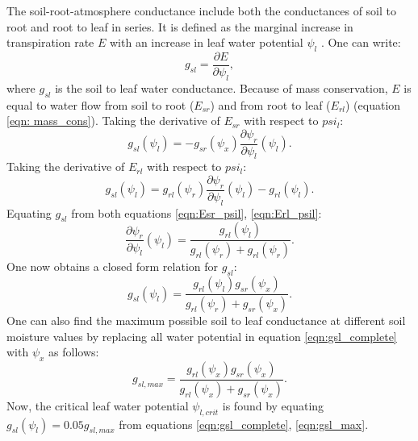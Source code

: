 \documentclass[utf8]{frontiersSCNS} %
\begin{document}
The soil-root-atmosphere conductance include both the conductances of soil to root and root to leaf in series. It is defined as the marginal increase in transpiration rate $E$ with an increase in leaf water potential $\psi_l$ \citep{sperry_what_2015}. One can write:
\begin{equation}
    \label{eqn:g_sl}
    g_{sl} = \frac{\partial E}{\partial \psi_l},
\end{equation}
where $g_{sl}$ is the soil to leaf water conductance. Because of mass conservation, $E$ is equal to water flow from soil to root ($E_{sr}$) and from root to leaf ($E_{rl}$) (equation \ref{eqn: mass_cons}).
Taking the derivative of $E_{sr}$ with respect to $psi_l$:
\begin{equation}
    \label{eqn:Esr_psil}
    g_{sl} (\psi_l) = - g_{sr} (\psi_x) \frac{\partial \psi_r}{\partial \psi_l} (\psi_l).
\end{equation}
Taking the derivative of $E_{rl}$ with respect to $psi_l$:
\begin{equation}
    \label{eqn:Erl_psil}
    g_{sl} (\psi_l) = g_{rl} (\psi_r) \frac{\partial \psi_r}{\partial \psi_l} (\psi_l) - g_{rl} (\psi_l).
\end{equation}
Equating $g_{sl}$ from both equations \ref{eqn:Esr_psil}, \ref{eqn:Erl_psil}:
\begin{equation}
    \label{eqn:psir_psil}
    \frac{\partial \psi_r}{\partial \psi_l} (\psi_l) = \frac{g_{rl} (\psi_l)}{g_{rl} (\psi_r) + g_{rl} (\psi_r)}.
\end{equation}
One now obtains a closed form relation for $g_{sl}$:
\begin{equation}
    \label{eqn:gsl_complete}
    g_{sl} (\psi_l) = \frac{g_{rl} (\psi_l) g_{sr} (\psi_x)}{g_{rl} (\psi_r) + g_{sr} (\psi_x)}.
\end{equation}
One can also find the maximum possible soil to leaf conductance at different soil moisture values by replacing all water potential in equation \ref{eqn:gsl_complete} with $\psi_x$ as follows:
\begin{equation}
    \label{eqn:gsl_max}
    g_{sl,max} = \frac{g_{rl} (\psi_x) g_{sr} (\psi_x)}{g_{rl} (\psi_x) + g_{sr} (\psi_x)}.
\end{equation}
Now, the critical leaf water potential $\psi_{l,crit}$ is found by equating $g_{sl}(\psi_l) = 0.05 g_{sl,max}$ from equations \ref{eqn:gsl_complete}, \ref{eqn:gsl_max}.
\end{document}
